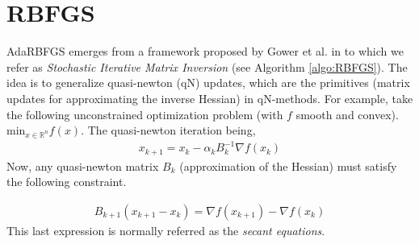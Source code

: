 \documentclass[12pt,conference,compsocconf]{IEEEtran}
\newcommand{\R}{\mathbb{R}}
\begin{document}
\section{RBFGS}\label{sect:rbfgs}
AdaRBFGS emerges from a framework proposed by Gower et al. in \cite{Gower1,Gower2} to which we refer as \textit{Stochastic Iterative Matrix Inversion} (see Algorithm \ref{algo:RBFGS}). The idea is to generalize quasi-newton (qN) updates, which are the primitives (matrix updates for approximating the inverse Hessian) in qN-methods. For example, take the following unconstrained optimization problem (with $f$ smooth and convex).
$\text{min}_{x \in \R^n} f(x)$. The quasi-newton iteration being, 
\begin{align}\label{eq:qnmethod}
x_{k+1}=x_k-\alpha_kB_k^{-1}\nabla f(x_k)
\end{align}
Now, any quasi-newton matrix $B_k$ (approximation of the Hessian) must satisfy the following constraint.

\begin{align}\label{eq:secant}
B_{k+1}(x_{k+1}-x_k)=\nabla f(x_{k+1})-\nabla f(x_k)
\end{align}
This last expression is normally referred as the \textit{secant equations}.
\vspace{-4mm}
\end{document}
